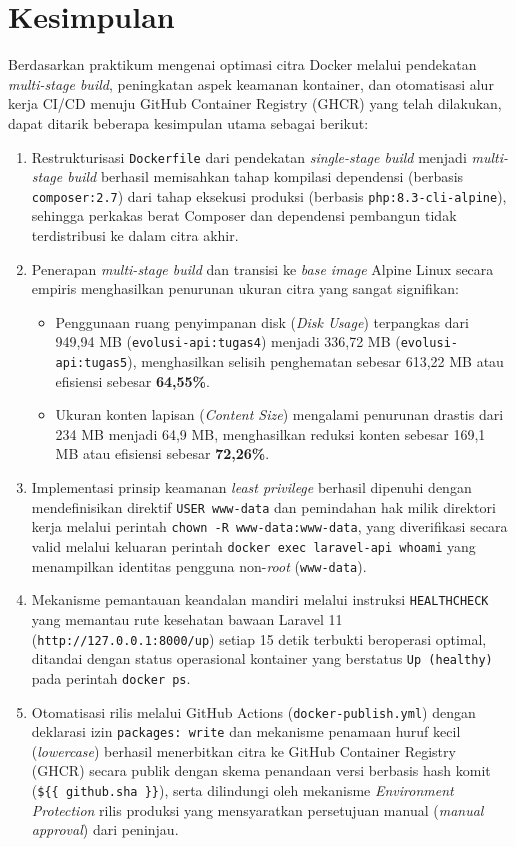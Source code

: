\chapter{Kesimpulan}

Berdasarkan praktikum mengenai optimasi citra Docker melalui pendekatan \textit{multi-stage build}, peningkatan aspek keamanan kontainer, dan otomatisasi alur kerja CI/CD menuju GitHub Container Registry (GHCR) yang telah dilakukan, dapat ditarik beberapa kesimpulan utama sebagai berikut:
\begin{enumerate}
    \item Restrukturisasi \texttt{Dockerfile} dari pendekatan \textit{single-stage build} menjadi \textit{multi-stage build} berhasil memisahkan tahap kompilasi dependensi (berbasis \texttt{composer:2.7}) dari tahap eksekusi produksi (berbasis \texttt{php:8.3-cli-alpine}), sehingga perkakas berat Composer dan dependensi pembangun tidak terdistribusi ke dalam citra akhir.
    \item Penerapan \textit{multi-stage build} dan transisi ke \textit{base image} Alpine Linux secara empiris menghasilkan penurunan ukuran citra yang sangat signifikan:
    \begin{itemize}
        \item Penggunaan ruang penyimpanan disk (\textit{Disk Usage}) terpangkas dari 949,94 MB (\texttt{evolusi-api:tugas4}) menjadi 336,72 MB (\texttt{evolusi-api:tugas5}), menghasilkan selisih penghematan sebesar 613,22 MB atau efisiensi sebesar \textbf{64{,}55\%}.
        \item Ukuran konten lapisan (\textit{Content Size}) mengalami penurunan drastis dari 234 MB menjadi 64,9 MB, menghasilkan reduksi konten sebesar 169,1 MB atau efisiensi sebesar \textbf{72{,}26\%}.
    \end{itemize}
    \item Implementasi prinsip keamanan \textit{least privilege} berhasil dipenuhi dengan mendefinisikan direktif \texttt{USER www-data} dan pemindahan hak milik direktori kerja melalui perintah \texttt{chown -R www-data:www-data}, yang diverifikasi secara valid melalui keluaran perintah \texttt{docker exec laravel-api whoami} yang menampilkan identitas pengguna non-\textit{root} (\texttt{www-data}).
    \item Mekanisme pemantauan keandalan mandiri melalui instruksi \texttt{HEALTHCHECK} yang memantau rute kesehatan bawaan Laravel 11 (\texttt{http://127.0.0.1:8000/up}) setiap 15 detik terbukti beroperasi optimal, ditandai dengan status operasional kontainer yang berstatus \texttt{Up (healthy)} pada perintah \texttt{docker ps}.
    \item Otomatisasi rilis melalui GitHub Actions (\texttt{docker-publish.yml}) dengan deklarasi izin \texttt{packages: write} dan mekanisme penamaan huruf kecil (\textit{lowercase}) berhasil menerbitkan citra ke GitHub Container Registry (GHCR) secara publik dengan skema penandaan versi berbasis hash komit (\texttt{\$\{\{ github.sha \}\}}), serta dilindungi oleh mekanisme \textit{Environment Protection} rilis produksi yang mensyaratkan persetujuan manual (\textit{manual approval}) dari peninjau.
\end{enumerate}


